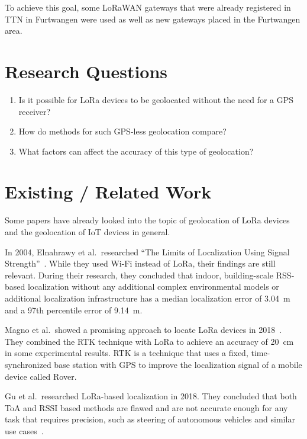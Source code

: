 To achieve this goal, some \ac{LoRaWAN} gateways that were already registered in \acf{TTN} in Furtwangen were used as well as new gateways placed in the Furtwangen area.

\section{Research Questions}\label{sec:introduction-research-questions}

\begin{enumerate}
      \item Is it possible for \ac{LoRa} devices to be geolocated without the need for a \ac{GPS} receiver?
      \item How do methods for such \ac{GPS}-less geolocation compare?
      \item What factors can affect the accuracy of this type of geolocation?
\end{enumerate}

\section{Existing / Related Work}\label{sec:related-work}

Some papers have already looked into the topic of geolocation of \ac{LoRa} devices and the geolocation of \ac{IoT} devices in general.

In 2004, Elnahrawy et al.\ researched ``The Limits of Localization Using Signal Strength''~\cite{elnahrawy_limits_2004}.
While they used Wi-Fi instead of \ac{LoRa}, their findings are still relevant.
During their research, they concluded that indoor, building-scale \ac{RSS}-based localization without any additional complex environmental models or additional localization infrastructure has a median localization error of \SI{3.04}{\meter} and a 97th percentile error of \SI{9.14}{\meter}.

Magno et al.\ showed a promising approach to locate \ac{LoRa} devices in 2018~\cite{magno_poster_2018}.
They combined the \acf{RTK} technique with \ac{LoRa} to achieve an accuracy of \SI{20}{\centi\meter} in some experimental results.
\ac{RTK} is a technique that uses a fixed, time-synchronized base station with \ac{GPS} to improve the localization signal of a mobile device called Rover.

Gu et al.\ researched \ac{LoRa}-based localization in 2018.
They concluded that both \ac{ToA} and \ac{RSSI} based methods are flawed and are not accurate enough for any task that requires precision, such as steering of autonomous vehicles and similar use cases~\cite{gu_lora-based_2018}.

